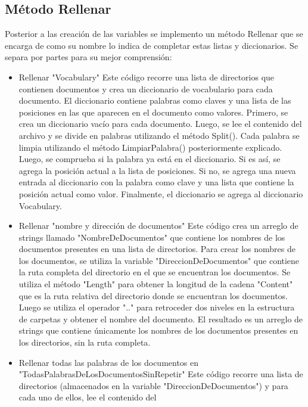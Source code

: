 \documentclass{article}
\begin{document}
\subsection{Método Rellenar }
Posterior a las creación de las variables se implemento un método Rellenar que 
se encarga de como su nombre lo indica de completar estas listas y 
diccionarios. Se separa por partes para su mejor comprensión:
\begin{itemize}
    \item Rellenar "Vocabulary" 
    Este código recorre una lista de directorios que contienen documentos y crea 
    un diccionario de vocabulario para cada documento. El diccionario contiene 
    palabras como claves y una lista de las posiciones en las que aparecen en el 
    documento como valores. 
    Primero, se crea un diccionario vacío para cada documento. Luego, se lee el 
    contenido del archivo y se divide en palabras utilizando el método Split(). Cada 
    palabra se limpia utilizando el método LimpiarPalabra() posteriormente 
    explicado. 
    Luego, se comprueba si la palabra ya está en el diccionario. Si es así, se 
    agrega la posición actual a la lista de posiciones. Si no, se agrega una nueva 
    entrada al diccionario con la palabra como clave y una lista que contiene la 
    posición actual como valor. 
    Finalmente, el diccionario se agrega al diccionario Vocabulary.
    \item  Rellenar "nombre y dirección de documentos"
    Este código crea un arreglo de strings llamado "NombreDeDocumentos" que 
    contiene los nombres de los documentos presentes en una lista de directorios. 
    Para crear los nombres de los documentos, se utiliza la variable 
    "DireccionDeDocumentos" que contiene la ruta completa del directorio en el 
    que se encuentran los documentos. 
    Se utiliza el método "Length" para obtener la longitud de la cadena 
    "Content" que es la ruta relativa del directorio donde se encuentran los 
    documentos. 
    Luego se utiliza el operador ".." para retroceder dos niveles en la estructura de 
    carpetas y obtener el nombre del documento. 
    El resultado es un arreglo de strings que contiene únicamente los nombres de 
    los documentos presentes en los directorios, sin la ruta completa.
    \item Rellenar todas las palabras de los documentos en 
    "TodasPalabrasDeLosDocumentosSinRepetir" 
    Este código recorre una lista de directorios (almacenados en la variable 
    "DireccionDeDocumentos") y para cada uno de ellos, lee el contenido del 

\end{itemize}
\end{document}

